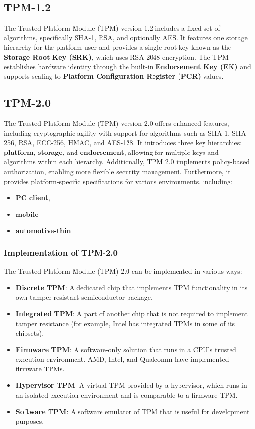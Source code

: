 \subsection{TPM-1.2}
The Trusted Platform Module (TPM) version 1.2 includes a fixed set of algorithms, specifically SHA-1, RSA, and optionally AES. It features one storage hierarchy for the platform user and provides a single root key known as the \textbf{Storage Root Key (SRK)}, which uses RSA-2048 encryption. The TPM establishes hardware identity through the built-in \textbf{Endorsement Key (EK)} and supports sealing to \textbf{Platform Configuration Register (PCR)} values.

\subsection{TPM-2.0}
The Trusted Platform Module (TPM) version 2.0 offers enhanced features, including cryptographic agility with support for algorithms such as SHA-1, SHA-256, RSA, ECC-256, HMAC, and AES-128. It introduces three key hierarchies: \textbf{platform}, \textbf{storage}, and \textbf{endorsement}, allowing for multiple keys and algorithms within each hierarchy. Additionally, TPM 2.0 implements policy-based authorization, enabling more flexible security management. Furthermore, it provides platform-specific specifications for various environments, including:
\begin{itemize}
    \item \textbf{PC client}, 
    \item \textbf{mobile} 
    \item \textbf{automotive-thin}
\end{itemize}


\subsubsection{Implementation of TPM-2.0}

The Trusted Platform Module (TPM) 2.0 can be implemented in various ways:

\begin{itemize}[left=0pt]
    \item \textbf{Discrete TPM}: A dedicated chip that implements TPM functionality in its own tamper-resistant semiconductor package.
    \item \textbf{Integrated TPM}: A part of another chip that is not required to implement tamper resistance (for example, Intel has integrated TPMs in some of its chipsets).
    \item \textbf{Firmware TPM}: A software-only solution that runs in a CPU's trusted execution environment. AMD, Intel, and Qualcomm have implemented firmware TPMs.
    \item \textbf{Hypervisor TPM}: A virtual TPM provided by a hypervisor, which runs in an isolated execution environment and is comparable to a firmware TPM.
    \item \textbf{Software TPM}: A software emulator of TPM that is useful for development purposes.
\end{itemize}


